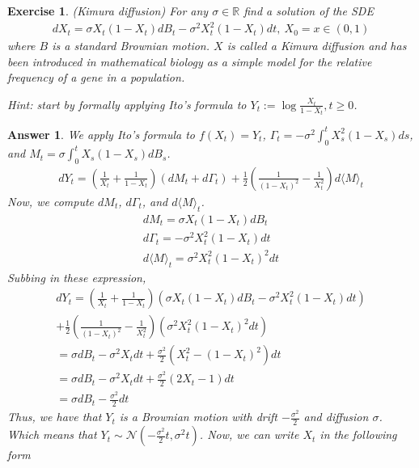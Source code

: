 \documentclass[12pt]{article}
\theoremstyle{colon}
\newtheorem{exercise}{Exercise}
\newtheorem*{answer}{Answer}
\begin{document}
\clearpage

\begin{exercise}
  (Kimura diffusion) For any $\sigma \in \mathbb{R}$ find a solution of the SDE
  \begin{gather*}
    d X_t = \sigma X_t (1 - X_t) d B_t - \sigma^2 X_t^2 (1 - X_t) dt, \ X_0 = x \in (0,1)
  \end{gather*}
  where $B$ is a standard Brownian motion. $X$ is called a \textit{Kimura diffusion} and has been introduced in mathematical biology as a simple model for the relative frequency of a gene in a population.

  \textit{Hint: start by formally applying Ito's formula to $Y_t := \log \frac{X_t}{1-X_t}, t \geq 0$.}
\end{exercise}

\begin{answer}
  We apply Ito's formula to $f(X_t) = Y_t$, $\Gamma_t = -\sigma^2 \int_0^t X_s^2 (1-X_s) ds$, and $M_t = \sigma \int_0^t X_s (1 - X_s) d B_s$.
  \begin{gather*}
    d Y_t = \left( \frac{1}{X_t} + \frac{1}{1 - X_t} \right)(d M_t + d \Gamma_t) + \frac{1}{2} \left(\frac{1}{(1-X_t)^2} - \frac{1}{X_t^2} \right) d \langle M \rangle_t
  \end{gather*}
  Now, we compute $d M_t$, $d \Gamma_t$, and $d \langle M \rangle_t$.
  \begin{gather*}
    d M_t = \sigma X_t (1 - X_t) d B_t \\
    d \Gamma_t = -\sigma^2 X_t^2 (1-X_t) dt\\
    d \langle M \rangle_t = \sigma^2 X_t^2 (1 - X_t)^2 dt
  \end{gather*}
  Subbing in these expression,
  \begin{gather*}
    d Y_t = \left( \frac{1}{X_t} + \frac{1}{1 - X_t} \right)(\sigma X_t (1 - X_t) d B_t -\sigma^2 X_t^2 (1-X_t) dt) \\
    + \frac{1}{2} \left(\frac{1}{(1-X_t)^2} - \frac{1}{X_t^2} \right) (\sigma^2 X_t^2 (1 - X_t)^2 dt) \\
    = \sigma d B_t - \sigma^2 X_t dt + \frac{\sigma^2}{2}(X_t^2 - (1 - X_t)^2)dt \\
    = \sigma d B_t - \sigma^2 X_t dt + \frac{\sigma^2}{2}(2 X_t - 1)dt \\
    = \sigma d B_t - \frac{\sigma^2}{2} dt
  \end{gather*}
  Thus, we have that $Y_t$ is a Brownian motion with drift $- \frac{\sigma^2}{2}$ and diffusion $\sigma$. Which means that $Y_t \sim \mathcal{N}(-\frac{\sigma^2}{2} t, \sigma^2 t)$. Now, we can write $X_t$ in the following form

\end{answer}
\end{document}
